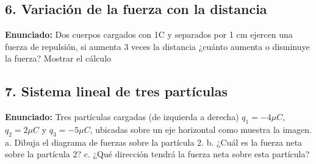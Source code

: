 \documentclass[12pt, letterpaper]{article}
\begin{document}
\subsection*{6. Variación de la fuerza con la distancia}
\noindent \textbf{Enunciado:} Dos cuerpos cargados con 1C y separados por 1 cm ejercen una fuerza de repulsión, si aumenta 3 veces la distancia ¿cuánto aumenta o disminuye la fuerza? Mostrar el cálculo %


\subsection*{7. Sistema lineal de tres partículas}
\noindent \textbf{Enunciado:} Tres partículas cargadas (de izquierda a derecha) $q_1=-4\mu C$, $q_2=2\mu C$ y $q_3=-5\mu C$, ubicadas sobre un eje horizontal como muestra la imagen. %
a. Dibuja el diagrama de fuerzas sobre la partícula 2. %
b. ¿Cuál es la fuerza neta sobre la partícula 2? %
c. ¿Qué dirección tendrá la fuerza neta sobre esta partícula? %
\end{document}
